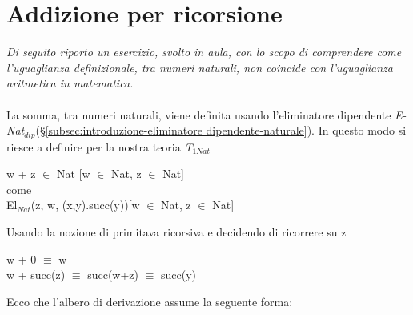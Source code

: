 \section{Addizione per ricorsione}
\label{subsec: addizione-per-ricorsione}
\textit{Di seguito riporto un esercizio, svolto in aula, con lo scopo di comprendere come l'uguaglianza definizionale, tra numeri naturali, non coincide con l'uguaglianza aritmetica in matematica.}
\\\\
La somma, tra numeri naturali, viene definita usando l'eliminatore dipendente \textit{E-Nat$_{dip}$}(\S \ref{subsec:introduzione-eliminatore dipendente-naturale}). In questo modo si riesce a definire per la nostra teoria \textit{T$_{1Nat}$}
\begin{center} w + z $\in$ Nat [w $\in$ Nat, z $\in$ Nat] \\ come \\ El$_{Nat}$(z, w, (x,y).succ(y))[w $\in$ Nat, z $\in$ Nat]\end{center}
Usando la nozione di primitava ricorsiva e decidendo di ricorrere su z \begin{center} w + 0 $\equiv$ w \\ w + succ(z) $\equiv$ succ(w+z) $\equiv$ succ(y)\end{center}
Ecco che l'albero di derivazione assume la seguente forma:
\scriptsize
\begin{adjustwidth}{-11em}{}
\begin{prooftree}
\end{prooftree}
\end{adjustwidth}
